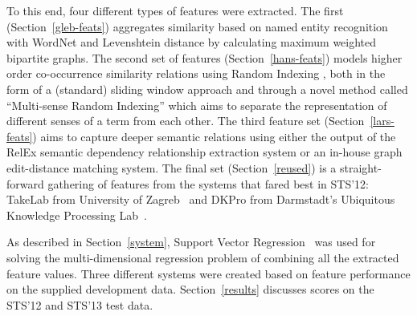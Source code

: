 To this end, four different types of features were extracted.
The first (Section~\ref{gleb-feats}) aggregates similarity based on named entity recognition with
WordNet and Levenshtein distance by calculating maximum weighted bipartite graphs.
%
The second set of features (Section~\ref{hans-feats}) models higher order co-occurrence 
similarity relations using Random Indexing \citep{Kanerva2000}, 
both in the form of a (standard) sliding window approach and 
through a novel method called ``Multi-sense Random Indexing'' which aims to
separate the representation of different senses of a term from each other.
%
The third feature set (Section~\ref{lars-feats}) aims to capture deeper semantic relations using 
either the output of the RelEx semantic dependency relationship extraction system \citep{bioinflmu-254} 
or an in-house graph edit-distance matching system.
%
The final set (Section~\ref{reused}) is a straight-forward gathering of features from the systems
that fared best in STS'12: TakeLab from University of Zagreb~\citep{vsaric2012takelab}
and DKPro from Darmstadt's Ubiquitous Knowledge Processing Lab~\citep{bar2012ukp}.

As described in Section~\ref{system}, Support Vector Regression~\citep{VapnikEA:97} was used
for solving the multi-dimensional regression problem of combining all the extracted feature values.
Three different systems were created based on feature performance on 
the supplied development data. %
Section~\ref{results} discusses scores on the STS'12 and STS'13 test data.